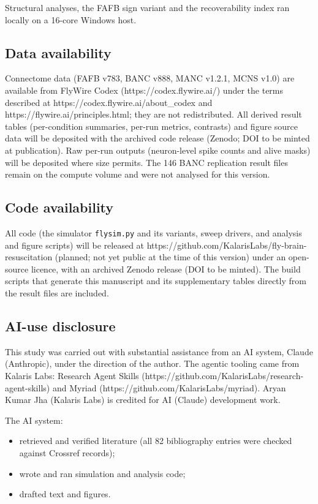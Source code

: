 \documentclass[11pt]{article}
\providecommand{\tightlist}{\setlength{\itemsep}{0pt}\setlength{\parskip}{0pt}}
\begin{document}
Structural analyses, the FAFB sign variant and the recoverability index ran locally on a 16-core Windows host.

\subsection{Data availability}\label{data-availability}

Connectome data (FAFB v783, BANC v888, MANC v1.2.1, MCNS v1.0) are available from FlyWire Codex (https://codex.flywire.ai/) under the terms described at https://codex.flywire.ai/about\_codex and https://flywire.ai/principles.html; they are not redistributed. All derived result tables (per-condition summaries, per-run metrics, contrasts) and figure source data will be deposited with the archived code release (Zenodo; DOI to be minted at publication). Raw per-run outputs (neuron-level spike counts and alive masks) will be deposited where size permits. The 146 BANC replication result files remain on the compute volume and were not analysed for this version.

\subsection{Code availability}\label{code-availability}

All code (the simulator \texttt{flysim.py} and its variants, sweep drivers, and analysis and figure scripts) will be released at https://github.com/KalarisLabs/fly-brain-resuscitation (planned; not yet public at the time of this version) under an open-source licence, with an archived Zenodo release (DOI to be minted). The build scripts that generate this manuscript and its supplementary tables directly from the result files are included.

\subsection{AI-use disclosure}\label{ai-use-disclosure}

This study was carried out with substantial assistance from an AI system, Claude (Anthropic), under the direction of the author. The agentic tooling came from Kalaris Labs: Research Agent Skills (https://github.com/KalarisLabs/research-agent-skills) and Myriad (https://github.com/KalarisLabs/myriad). Aryan Kumar Jha (Kalaris Labs) is credited for AI (Claude) development work.

The AI system:

\begin{itemize}
\tightlist
\item
  retrieved and verified literature (all 82 bibliography entries were checked against Crossref records);
\item
  wrote and ran simulation and analysis code;
\item
  drafted text and figures.
\end{itemize}
\end{document}
